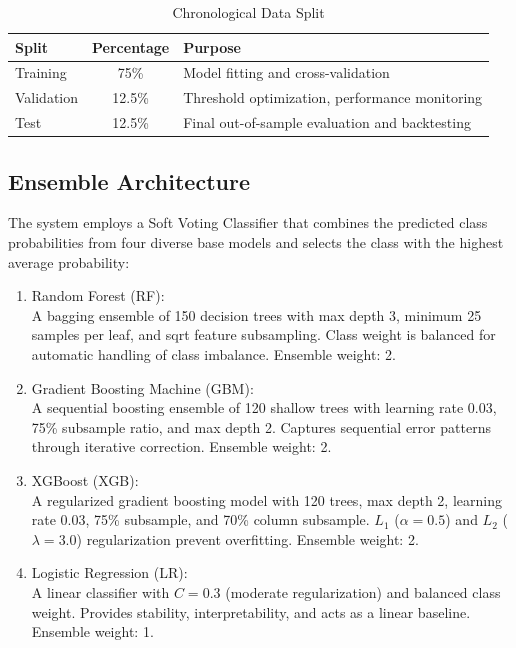 \documentclass[12pt, a4paper]{report}
\begin{document}
	\begin{table}[H]
		\centering
		\begin{tabularx}{\textwidth}{|l|c|X|}
			\hline
			\textbf{Split} & \textbf{Percentage} & \textbf{Purpose} \\
			\hline
			Training & 75\% & Model fitting and cross-validation \\
			\hline
			Validation & 12.5\% & Threshold optimization, performance monitoring \\
			\hline
			Test & 12.5\% & Final out-of-sample evaluation and backtesting \\
			\hline
		\end{tabularx}
		\caption{Chronological Data Split}
		\label{tab:data-split}
	\end{table}
	
	\subsection{Ensemble Architecture}
	The system employs a Soft Voting Classifier that combines the predicted class probabilities from four diverse base models and selects the class with the highest average probability:
	
	\vspace{-18pt}
	\begin{enumerate}
		\renewcommand{\labelenumi}{\roman{enumi}.}
		\item Random Forest (RF):\\
		A bagging ensemble of 150 decision trees with max depth 3, minimum 25 samples per leaf, and sqrt feature subsampling. Class weight is balanced for automatic handling of class imbalance. Ensemble weight: 2.
		\item Gradient Boosting Machine (GBM):\\
		A sequential boosting ensemble of 120 shallow trees with learning rate 0.03, 75\% subsample ratio, and max depth 2. Captures sequential error patterns through iterative correction. Ensemble weight: 2.
		\item XGBoost (XGB):\\
		A regularized gradient boosting model with 120 trees, max depth 2, learning rate 0.03, 75\% subsample, and 70\% column subsample. $L_1$ ($\alpha=0.5$) and $L_2$ ($\lambda=3.0$) regularization prevent overfitting. Ensemble weight: 2.
		\item Logistic Regression (LR):\\
		A linear classifier with $C = 0.3$ (moderate regularization) and balanced class weight. Provides stability, interpretability, and acts as a linear baseline. Ensemble weight: 1.
	\end{enumerate}
	
\end{document}
